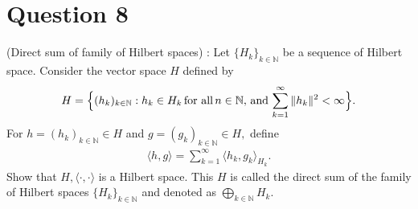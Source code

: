 \section{Question 8}

\horz

(Direct sum of family of Hilbert spaces) : Let $\{H_k\}_{k\in \mathbb N}$ be a sequence of Hilbert space. Consider the vector space $H$ defined by 
\begin{align*}
H = \Big\{ (h_k)_{k\in\mathbb N} : h_k\in H_k \mbox{\,for all\,} n\in\mathbb N, \,\mbox{and}\, \sum\limits_{k=1}^{\infty}\|h_k\|^2 < \infty\Big\}.
\end{align*}
For $h= (h_k)_{k\in\mathbb N} \in H$ and $g = (g_k)_{k\in\mathbb N}\in H,$ define
\begin{align*}
\langle h,g\rangle = \sum\limits_{k=1}^{\infty} \langle h_k,g_k\rangle_{H_k}.
\end{align*} 
Show that $H,\langle \cdot, \cdot \rangle$ is a Hilbert space. This $H$ is called the direct sum of the family of Hilbert spaces  $\{H_k\}_{k\in \mathbb N}$ and denoted as $\bigoplus\limits _{k\in\mathbb N} H_k.$


\horz
